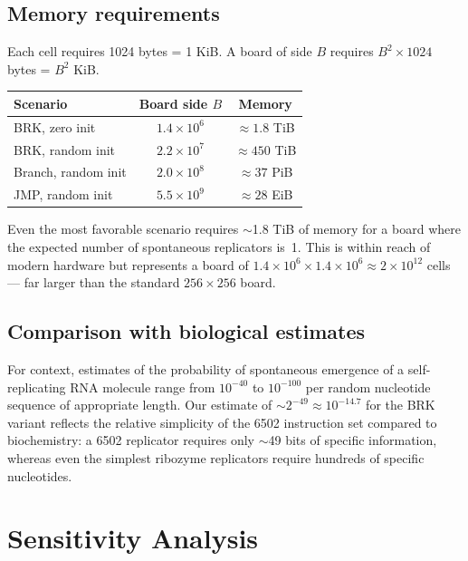 \documentclass{article}
\begin{document}
\subsection{Memory requirements}

Each cell requires 1024 bytes = 1 KiB. A board of side $B$ requires
$B^2 \times 1024$ bytes = $B^2$ KiB.

\begin{center}
\begin{tabular}{lcc}
\toprule
Scenario & Board side $B$ & Memory \\
\midrule
BRK, zero init & $1.4 \times 10^6$ & $\approx 1.8$ TiB \\
BRK, random init & $2.2 \times 10^7$ & $\approx 450$ TiB \\
Branch, random init & $2.0 \times 10^8$ & $\approx 37$ PiB \\
JMP, random init & $5.5 \times 10^9$ & $\approx 28$ EiB \\
\bottomrule
\end{tabular}
\end{center}

Even the most favorable scenario requires $\sim$1.8 TiB of memory for
a board where the expected number of spontaneous replicators is~1. This
is within reach of modern hardware but represents a board of
$1.4 \times 10^6 \times 1.4 \times 10^6 \approx 2 \times 10^{12}$
cells --- far larger than the standard $256 \times 256$ board.

\subsection{Comparison with biological estimates}

For context, estimates of the probability of spontaneous emergence of a
self-replicating RNA molecule range from $10^{-40}$ to $10^{-100}$ per
random nucleotide sequence of appropriate length. Our estimate of
$\sim 2^{-49} \approx 10^{-14.7}$ for the BRK variant reflects the
relative simplicity of the 6502 instruction set compared to
biochemistry: a 6502 replicator requires only $\sim$49 bits of specific
information, whereas even the simplest ribozyme replicators require
hundreds of specific nucleotides.

\section{Sensitivity Analysis}
\label{sec:sensitivity}
\end{document}
